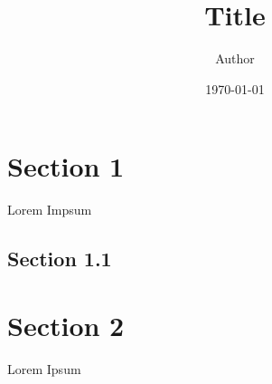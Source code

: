 \documentclass[11pt]{article}
\title { Title}
\author{ Author }
\date  {\today}
\begin{document}
\maketitle	
\pagebreak


\tableofcontents
\pagebreak


\section{Section 1} %

Lorem Impsum

\subsection{Section 1.1} %

\pagebreak

\section{Section 2}

Lorem Ipsum \\

\end{document}
